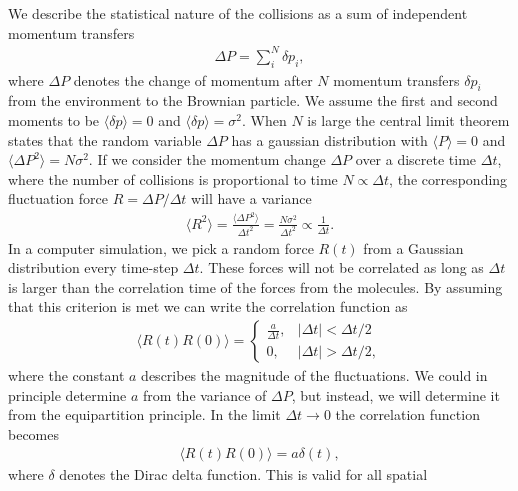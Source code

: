 We describe the statistical nature of the collisions as a sum of
independent momentum transfers
\begin{align*}
  \Delta P = \sum_i^N \delta p_i,
\end{align*}
where $\Delta P$ denotes the change of momentum after $N$ momentum transfers
$\delta p_i$ from the environment to the Brownian particle. We assume the first
and second moments to be $\langle \delta p \rangle = 0$ and  $\langle \delta p \rangle
= \sigma^2$. When $N$ is large the central limit theorem states that the random
variable $\Delta P$ has a gaussian distribution with  $\langle P \rangle = 0$
and $\langle \Delta P^2 \rangle = N\sigma^2$. If we consider the momentum change
$\Delta P$ over a discrete time $\Delta t$, where the number of collisions is
proportional to time $N \propto \Delta t$, the corresponding fluctuation force
$R = \Delta P / \Delta t$ will have a variance 
\begin{align*}
  \langle R^2 \rangle = \frac{\langle \Delta P^2 \rangle}{\Delta t^2} = \frac{N \sigma^2}{\Delta t^2}  \propto \frac{1}{\Delta t}.
\end{align*}
In a computer simulation, we pick a random force $R(t)$ from a Gaussian
distribution every time-step $\Delta t$. These forces will not be correlated as
long as $\Delta t$ is larger than the correlation time of the forces from the
molecules. By assuming that this criterion is met we can write the correlation function as 
\begin{align}
  \langle R(t) R(0) \rangle = 
  \begin{cases}
    \frac{a}{\Delta t}, & |\Delta t| < \Delta t/2 \\
    0, & |\Delta t| > \Delta t/2,
    \label{eq:disc_corr}
  \end{cases}
\end{align}
where the constant $a$ describes the magnitude of the fluctuations. We could in principle determine $a$ from the variance of $\Delta P$, but instead, we will determine it from the equipartition principle. In the limit $\Delta t \to 0$ the correlation function becomes
\begin{align}
  \langle R(t)R(0) \rangle = a \delta(t),
  \label{eq:F_corr}
\end{align}
where $\delta$ denotes the Dirac delta function. This is valid for all spatial
